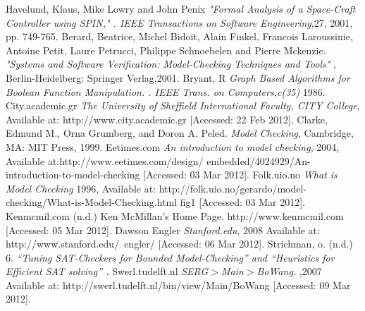 \documentclass{article}
\begin{document}
\begin{thebibliography}{}

 Havelund, Klaus, Mike Lowry and John Penix \emph{"Formal Analysis of a Space-Craft Controller using SPIN," . IEEE Transactions on Software Engineering},27, 2001, pp. 749-765.
 Berard, Beatrice, Michel Bidoit, Alain Finkel, Francois Laroussinie, Antoine Petit, Laure Petrucci, Philippe Schnoebelen and Pierre Mckenzie.  \emph{"Systems and Software Verification: Model-Checking Techniques and Tools"} , Berlin-Heidelberg: Springer Verlag,2001.
 Bryant, R \emph{Graph Based Algorithms for Boolean Function Manipulation. . IEEE Trans. on Computers,c(35)} 1986.
 City.academic.gr \emph{The University of Sheffield International Faculty, CITY College}, Available at: http://www.city.academic.gr [Accessed: 22 Feb 2012].
\bibitem{ }
Clarke, Edmund M., Orna Grumberg, and Doron A. Peled. \emph{Model Checking}, Cambridge, MA: MIT Press, 1999.
\bibitem{}
Eetimes.com \emph{An introduction to model checking}, 2004, Available at:http://www.eetimes.com/design/ embedded/4024929/An-introduction-to-model-checking [Accessed: 03 Mar 2012].
 Folk.uio.no \emph{What is Model Checking} 1996, Available at: http://folk.uio.no/gerardo/model-checking/What-is-Model-Checking.html fig1 [Accessed: 03 Mar 2012].
 Kenmcmil.com (n.d.) Ken McMillan's Home Page. http://www.kenmcmil.com [Accessed: 05 Mar 2012].
 Dawson Engler \emph{Stanford.edu}, 2008 Available at: http://www.stanford.edu/~engler/ [Accessed: 06 Mar 2012].  
 Strichman, o. (n.d.) 6.  \emph{“Tuning SAT-Checkers for Bounded Model-Checking” and “Heuristics for Efficient SAT solving” .}
 Swerl.tudelft.nl \emph{SERG$>$Main$>$BoWang.} ,2007 Available at: http://swerl.tudelft.nl/bin/view/Main/BoWang [Accessed: 09 Mar 2012]. 






\end{thebibliography}
\end{document}
